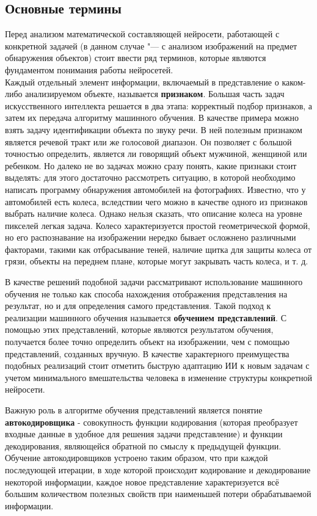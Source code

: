 \documentclass[bachelor, och, coursework]{shiza}
\begin{document}
    \subsection{Основные термины}
        Перед анализом математической составляющей нейросети, работающей с конкретной задачей (в данном случае "--- с анализом изображений на предмет обнаружения объектов) стоит ввести ряд терминов, которые являются фундаментом понимания работы нейросетей.\\
        Каждый отдельный элемент информации, включаемый в представление о каком-либо анализируемом объекте, называется \textbf{признаком}. Большая часть задач искусственного интеллекта решается в два этапа: корректный подбор признаков, а затем их передача алгоритму машинного обучения. В качестве примера можно взять задачу идентификации объекта по звуку речи. В ней полезным признаком является речевой тракт или же голосовой диапазон. Он
        позволяет с большой точностью определить, является ли говорящий объект мужчиной, женщиной или
        ребенком.
        Но далеко не во задачах можно сразу понять, какие признаки стоит выделять: для этого достаточно рассмотреть ситуацию, в которой необходимо написать программу обнаружения автомобилей на фотографиях. Известно, что у автомобилей есть колеса, вследствии чего можно в качестве одного из признаков выбрать наличие колеса. Однако нельзя сказать, что описание колеса на уровне пикселей легкая задача.
        Колесо характеризуется простой геометрической формой, но его распознавание на изображении
        нередко бывает осложнено различными факторами, такими как отбрасывание теней, наличие щитка для защиты колеса от грязи, объекты на переднем плане, которые могут закрывать часть колеса, и т. д.

        В качестве решений подобной задачи рассматривают использование машинного обучения не только как способа нахождения отображения представления на результат, но и для определения самого представления. Такой подход к реализации машинного обучения называется \textbf{обучением представлений}. С помощью этих представлений, которые являются результатом обучения, получается более точно определить объект на изображении, чем с помощью представлений, созданных вручную. В качестве характерного преимущества подобных реализаций стоит отметить быструю адаптацию ИИ к новым задачам с учетом минимального вмешательства человека в изменение структуры конкретной нейросети. 

        Важную роль в алгоритме обучения представлений является понятие \textbf{автокодировщика} - совокупность функции кодирования (которая преобразует входные данные в удобное для решения задачи представление) и функции декодирования, являющейся обратной по смыслу к предыдущей функции. Обучение автокодировщиков устроено таким образом, что при каждой последующей итерации, в ходе которой происходит кодирование и декодирование некоторой информации, каждое новое представление характеризуется всё большим количеством полезных свойств при наименьшей потери обрабатываемой информации.
\end{document}
